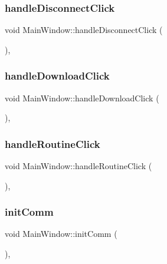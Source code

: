 \subsubsection{\texorpdfstring{handle\+Disconnect\+Click}{handleDisconnectClick}}
{\footnotesize\ttfamily void Main\+Window\+::handle\+Disconnect\+Click (\begin{DoxyParamCaption}{ }\end{DoxyParamCaption})\hspace{0.3cm}{\ttfamily [private]}, {\ttfamily [slot]}}

\mbox{\label{class_main_window_a19632dc3a31d674e845e237576bf8191}} 
\subsubsection{\texorpdfstring{handle\+Download\+Click}{handleDownloadClick}}
{\footnotesize\ttfamily void Main\+Window\+::handle\+Download\+Click (\begin{DoxyParamCaption}{ }\end{DoxyParamCaption})\hspace{0.3cm}{\ttfamily [private]}, {\ttfamily [slot]}}

\mbox{\label{class_main_window_abd7dc3af4e03fd257fcac427474ceeff}} 
\subsubsection{\texorpdfstring{handle\+Routine\+Click}{handleRoutineClick}}
{\footnotesize\ttfamily void Main\+Window\+::handle\+Routine\+Click (\begin{DoxyParamCaption}{ }\end{DoxyParamCaption})\hspace{0.3cm}{\ttfamily [private]}, {\ttfamily [slot]}}

\mbox{\label{class_main_window_a3ae7677276119857e128f826c8b069c8}} 
\subsubsection{\texorpdfstring{init\+Comm}{initComm}}
{\footnotesize\ttfamily void Main\+Window\+::init\+Comm (\begin{DoxyParamCaption}{ }\end{DoxyParamCaption})\hspace{0.3cm}{\ttfamily [private]}, {\ttfamily [slot]}}

